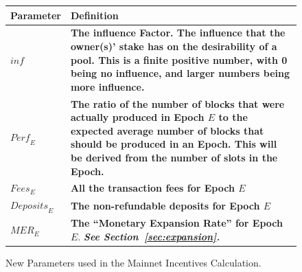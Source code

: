 \documentclass[11pt,a4paper,dvipsnames,twosided,final]{article}
\newcommand{\ada}{ADA{}}
\begin{document}
\begin{figure}[h!]
\begin{center}
\begin{tabular}{||l|p{13cm}||}
  \hline \hline
  \textbf{Parameter} & \textbf{Definition} \\\hline
\textbf{\color{green}  $\textit{inf}$} & \textbf{\color{green} The influence Factor. The influence that the owner(s)' stake has on the
  desirability of a pool. This is a finite positive number, with 0 being no influence, and larger numbers being more influence. } \\\hline
\textbf{\color{cyan}  $\textit{Perf}_E$} & \textbf{\color{cyan} The ratio of the number of blocks that were actually produced in Epoch $E$ to the expected average number of blocks that should be produced in an Epoch.
  This will be derived from the number of slots in the Epoch.} \\\hline
\textbf{\color{cyan}$\textit{Fees}_E$} & \textbf{\color{cyan}All the transaction fees for Epoch $E$} \\\hline
\textbf{\color{cyan}$\textit{Deposits}_E$} & \textbf{\color{cyan} The non-refundable deposits for Epoch $E$} \\\hline
\textbf{\color{cyan} $\textit{MER}_E$} & \textbf{\color{cyan} The ``Monetary Expansion Rate'' for Epoch $E$}. \newline \textbf{\color{cyan} \emph{See Section~\ref{sec:expansion}.}} \\\hline
\hline
\end{tabular}
\end{center}
\caption{New Parameters used in the Mainnet Incentives Calculation.}
\end{figure}
\end{document}
